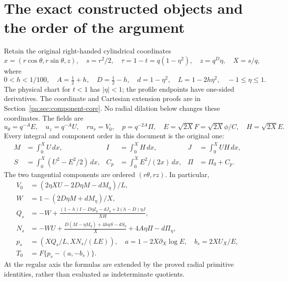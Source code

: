 \documentclass[10pt,a4paper]{article}
\begin{document}
\section{The exact constructed objects and the order of the argument}
Retain the original right-handed cylindrical coordinates
\[
 x=(r\cos\theta,r\sin\theta,z),\quad s=r^2/2,\quad
 \tau=1-t=q(1-\eta^2),\quad z=q^D\eta,\quad X=s/q,
\]
where
\[
 0<h<1/100,\quad A=\tfrac12+h,\quad D=\tfrac12-h,
 \quad d=1-\eta^2,\quad L=1-2h\eta^2,\quad -1\le\eta\le1.
\]
The physical chart for $t<1$ has $|\eta|<1$; the profile endpoints have one-sided
derivatives. The coordinate and Cartesian extension proofs are in
Section~\ref{pa:sec:component-core}. No radial dilation below changes these coordinates.
The fields are
\[
 u_\theta=q^{-A}E,\quad u_z=q^{-A}U,\quad ru_r=V_0,\quad
 p=q^{-2A}\Pi,\quad E=\sqrt{2X}F=\sqrt{2X}\phi/C,
 \quad H=\sqrt{2X}E.
\]
Every integral and component order in this document is the original one:
\[
 \begin{aligned}
 M&=\int_0^XU\,dx,&I&=\int_0^XH\,dx,&J&=\int_0^XUH\,dx,\\
 S&=\int_0^X(U^2-E^2/2)\,dx,&
 C_p&=\int_0^XE^2/(2x)\,dx,&\Pi&=\Pi_0+C_p.
 \end{aligned}
\]
The two tangential components are ordered $(r\theta,rz)$. In particular,
\[
\begin{split}
 V_0&=(2\eta XU-2D\eta M-dM_\eta)/L,\\
 W&=1-(2D\eta M+dM_\eta)/X,\\
 Q_s&=-W+\frac{(1-h)I-D\eta I_\eta-dJ_\eta+2(h-D)\eta J}{XH},\\
 N_s&=-WU+\frac{D(M-\eta M_\eta)+4h\eta S-dS_\eta}{X}
            +4A\eta\Pi-d\Pi_\eta,\\
 p_s&=(XQ_s/L,XN_s/(LE)),\quad
 a=1-2X\partial_X\log E,\quad b_s=2XU_X/E,\\
 T_0&=F\{p_s-(a,-b_s)\}.
\end{split}                                                     \tag{PA.1}
\]
At the regular axis the formulas are extended by the proved radial primitive
identities, rather than evaluated as indeterminate quotients.
\end{document}
